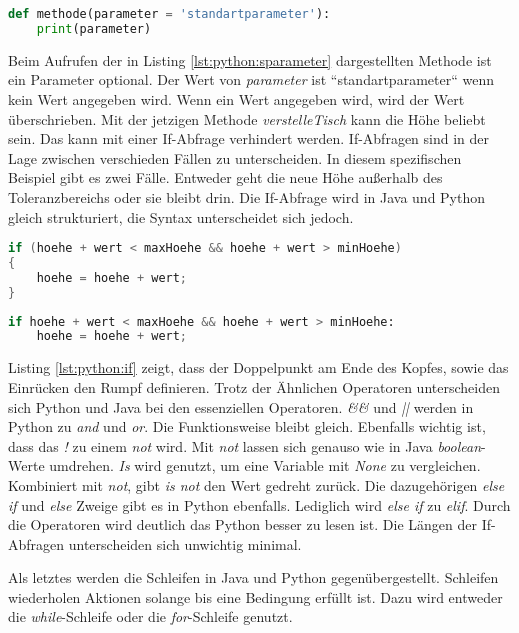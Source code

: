 \begin{lstlisting}[language=python,caption={Methode in Python mit Standartparameter},captionpos=b,label={lst:python:sparameter}]
def methode(parameter = 'standartparameter'):
    print(parameter)
\end{lstlisting}

Beim Aufrufen der in Listing \ref{lst:python:sparameter} dargestellten Methode ist ein Parameter optional. Der Wert von \textit{parameter} ist “standartparameter“ wenn kein Wert angegeben wird. Wenn ein Wert angegeben wird, wird der Wert überschrieben.
Mit der jetzigen Methode \textit{verstelleTisch} kann die Höhe beliebt sein. Das kann mit einer If-Abfrage verhindert werden. If-Abfragen sind in der Lage zwischen verschieden Fällen zu unterscheiden. In diesem spezifischen Beispiel gibt es zwei Fälle. Entweder geht die neue Höhe außerhalb des Toleranzbereichs oder sie bleibt drin. Die If-Abfrage wird in Java und Python gleich strukturiert, die Syntax unterscheidet sich jedoch. \cite{Python3:Buch}\cite{Louis:2010}

\begin{lstlisting}[language=java,caption={If-Abfrage in Java},captionpos=b,label={lst:java:if}]
if (hoehe + wert < maxHoehe && hoehe + wert > minHoehe)
{
    hoehe = hoehe + wert;
}
\end{lstlisting}

\begin{lstlisting}[language=python,caption={If-Abfrage in Python},captionpos=b,label={lst:python:if}]
if hoehe + wert < maxHoehe && hoehe + wert > minHoehe:
    hoehe = hoehe + wert;
\end{lstlisting}

Listing \ref{lst:python:if} zeigt, dass der Doppelpunkt am Ende des Kopfes, sowie das Einrücken den Rumpf definieren.
Trotz der Ähnlichen Operatoren unterscheiden sich Python und Java bei den essenziellen Operatoren. \textit{\&\&} und \textit{||} werden in Python zu \textit{and} und \textit{or}. Die Funktionsweise bleibt gleich. Ebenfalls wichtig ist, dass das \textit{!} zu einem \textit{not} wird. Mit \textit{not} lassen sich genauso wie in Java \textit{boolean}-Werte umdrehen. \textit{Is} wird genutzt, um eine Variable mit \textit{None} zu vergleichen. Kombiniert mit \textit{not}, gibt \textit{is not} den Wert gedreht zurück. \cite{Python3:Buch}\cite{Louis:2010}
Die dazugehörigen \textit{else if} und \textit{else} Zweige gibt es in Python ebenfalls. Lediglich wird \textit{else if} zu \textit{elif}. Durch die Operatoren wird deutlich das Python besser zu lesen ist. Die Längen der If-Abfragen unterscheiden sich unwichtig minimal.\par
Als letztes werden die Schleifen in Java und Python gegenübergestellt. Schleifen wiederholen Aktionen solange bis eine Bedingung erfüllt ist. Dazu wird entweder die \textit{while}-Schleife oder die \textit{for}-Schleife genutzt.

